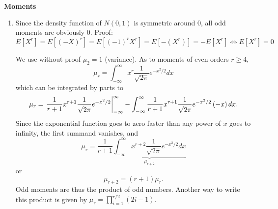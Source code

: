 \documentclass{article}
\begin{document}
\begin{solution}
\textbf{Moments}

\begin{enumerate}
\item Since the density function of $N(0,1)$ is symmetric around 0, all
    odd moments are obviously 0. Proof:
    \begin{equation*}
      E[X^r] = E[(-X)^r] = E[(-1)^r X^r] = E[-(X^r)]=-E[X^r]\Leftrightarrow E[X^r] = 0
    \end{equation*}

    We use without proof $\mu _{2}=1$ (variance). As to moments of even
    orders $r\geq 4$,
\begin{equation*}
\mu _{r}=\int_{-\infty }^{\infty }x^{r}\frac{1}{\sqrt{2\pi }}e^{-x^{2}/2}dx
\end{equation*}%
which can be integrated by parts to
\begin{equation*}
\mu _{r}=\left. \frac{1}{r+1}x^{r+1}\frac{1}{\sqrt{2\pi }}%
e^{-x^{2}/2}\right\vert _{-\infty }^{\infty }-\int_{-\infty }^{\infty }\frac{%
1}{r+1}x^{r+1}\frac{1}{\sqrt{2\pi }}e^{-x^{2}/2}\left( -x\right) dx.
\end{equation*}%
Since the exponential function goes to zero faster than any power of $x$
goes to infinity, the first summand vanishes, and%
\begin{equation*}
\mu _{r}=\frac{1}{r+1}\underbrace{\int_{-\infty }^{\infty }x^{r+2}\frac{1}{\sqrt{2\pi }}e^{-x^{2}/2}dx}_{\mu_{r+2}}
\end{equation*}%
or%
\begin{equation*}
\mu _{r+2}=\left( r+1\right) \mu _{r}.
\end{equation*}%
Odd moments are thus the product of odd numbers. Another way to write
this product is given by $\mu _{r}=\prod_{i=1}^{r/2}\left( 2i-1\right) $.


\end{enumerate}
\end{solution}
\end{document}
